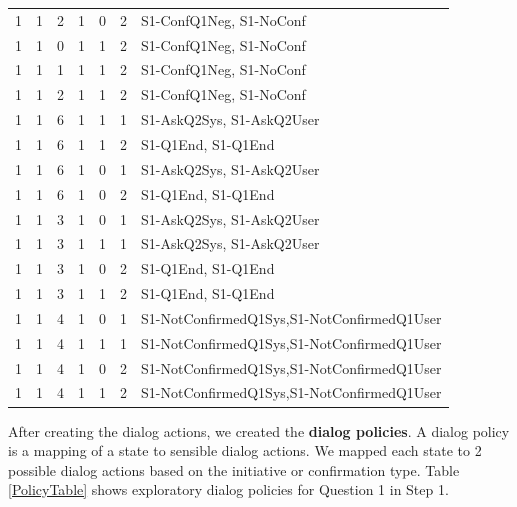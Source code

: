 \begin{sloppy}
\begin{table}
\begin{tabular}{ | l l l l l l | p{49mm}| }
   1 & 1 & 2 & 1 & 0 & 2 & S1-ConfQ1Neg, S1-NoConf \\
   1 & 1 & 0 & 1 & 1 & 2 & S1-ConfQ1Neg, S1-NoConf \\
   1 & 1 & 1 & 1 & 1 & 2 & S1-ConfQ1Neg, S1-NoConf \\
   1 & 1 & 2 & 1 & 1 & 2 & S1-ConfQ1Neg, S1-NoConf \\
   1 & 1 & 6 & 1 & 1 & 1 & S1-AskQ2Sys, S1-AskQ2User \\
   1 & 1 & 6 & 1 & 1 & 2 & S1-Q1End, S1-Q1End \\
   1 & 1 & 6 & 1 & 0 & 1 & S1-AskQ2Sys, S1-AskQ2User \\
   1 & 1 & 6 & 1 & 0 & 2 & S1-Q1End, S1-Q1End \\
   1 & 1 & 3 & 1 & 0 & 1 & S1-AskQ2Sys, S1-AskQ2User \\
   1 & 1 & 3 & 1 & 1 & 1 & S1-AskQ2Sys, S1-AskQ2User \\
   1 & 1 & 3 & 1 & 0 & 2 & S1-Q1End, S1-Q1End \\
   1 & 1 & 3 & 1 & 1 & 2 & S1-Q1End, S1-Q1End \\
   1 & 1 & 4 & 1 & 0 & 1 & S1-NotConfirmedQ1Sys,S1-NotConfirmedQ1User \\
   1 & 1 & 4 & 1 & 1 & 1 & S1-NotConfirmedQ1Sys,S1-NotConfirmedQ1User \\
   1 & 1 & 4 & 1 & 0 & 2 & S1-NotConfirmedQ1Sys,S1-NotConfirmedQ1User \\
     1 & 1 & 4 & 1 & 1 & 2 & S1-NotConfirmedQ1Sys,S1-NotConfirmedQ1User \\
 	  \hline
         \end{tabular}
\end{table}


After creating the dialog actions, we created the {\bf dialog policies}. A dialog policy is a mapping of a state to sensible dialog actions. We mapped each state to 2 possible dialog actions based on the initiative or confirmation type. Table \ref{PolicyTable} shows exploratory dialog policies for  Question 1 in Step 1. 




\end{sloppy}
